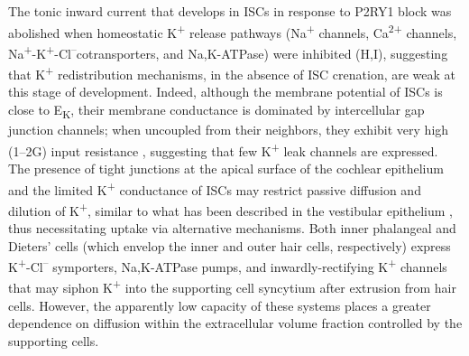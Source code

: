 \documentclass[9pt,lineno]{elife}
\begin{document}
The tonic inward current that develops in ISCs in response to P2RY1 block was abolished when homeostatic K\textsuperscript{+} release pathways (Na\textsuperscript{+} channels, Ca\textsuperscript{2+} channels, Na\textsuperscript{+}-K\textsuperscript{+}-Cl\textsuperscript{--}cotransporters, and Na,K-ATPase) were inhibited (H,I), suggesting that K\textsuperscript{+} redistribution mechanisms, in the absence of ISC crenation, are weak at this stage of development. Indeed, although the membrane potential of ISCs is close to E\textsubscript{K}, their membrane conductance is dominated by intercellular gap junction channels; when uncoupled from their neighbors, they exhibit very high (1--2G\textohm) input resistance \citep{Jagger2014,Wang2015}, suggesting that few K\textsuperscript{+} leak channels are expressed. The presence of tight junctions at the apical surface of the cochlear epithelium and the limited K\textsuperscript{+} conductance of ISCs may restrict passive diffusion and dilution of K\textsuperscript{+}, similar to what has been described in the vestibular epithelium \citep{Contini2017}, thus necessitating uptake via alternative mechanisms. Both inner phalangeal and Dieters' cells (which envelop the inner and outer hair cells, respectively) express K\textsuperscript{+}-Cl\textsuperscript{--} symporters, Na,K-ATPase pumps, and inwardly-rectifying K\textsuperscript{+} channels that may siphon K\textsuperscript{+} into the supporting cell syncytium after extrusion from hair cells. However, the apparently low capacity of these systems places a greater dependence on diffusion within the extracellular volume fraction controlled by the supporting cells. 
\end{document}

